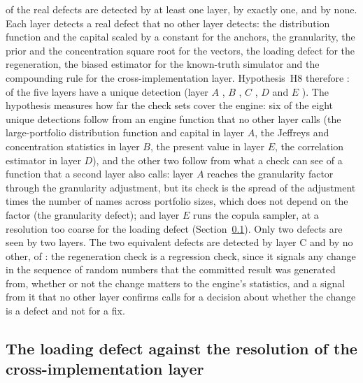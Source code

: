 \ablAny{} of the \ablReal{} real defects are detected by at least one layer, \ablOnly{} by exactly one, and \ablNone{} by none. Each layer detects a real defect that no other layer detects: the distribution function and the capital scaled by a constant for the anchors, the granularity, the prior and the concentration square root for the vectors, the loading defect for the regeneration, the biased estimator for the known-truth simulator and the compounding rule for the cross-implementation layer. Hypothesis~H8 therefore \ablHEight{}: \ablLayersWithUnique{} of the five layers have a unique detection (layer $A$ \ablAUnique{}, $B$ \ablBUnique{}, $C$ \ablCUnique{}, $D$ \ablDUnique{} and $E$ \ablEUnique{}). The hypothesis measures how far the check sets cover the engine: six of the eight unique detections follow from an engine function that no other layer calls (the large-portfolio distribution function and capital in layer $A$, the Jeffreys and concentration statistics in layer $B$, the present value in layer $E$, the correlation estimator in layer $D$), and the other two follow from what a check can see of a function that a second layer also calls: layer $A$ reaches the granularity factor through the granularity adjustment, but its check is the spread of the adjustment times the number of names across portfolio sizes, which does not depend on the factor (the granularity defect); and layer $E$ runs the copula sampler, at a resolution too coarse for the loading defect (Section~\ref{sec:loading-defect}). Only two defects are seen by two layers. The two equivalent defects are detected by layer C and by no other, \ablCEquiv{} of \ablEquiv{}: the regeneration check is a regression check, since it signals any change in the sequence of random numbers that the committed result was generated from, whether or not the change matters to the engine's statistics, and a signal from it that no other layer confirms calls for a decision about whether the change is a defect and not for a fix.

\subsection{The loading defect against the resolution of the cross-implementation layer}
\label{sec:loading-defect}

